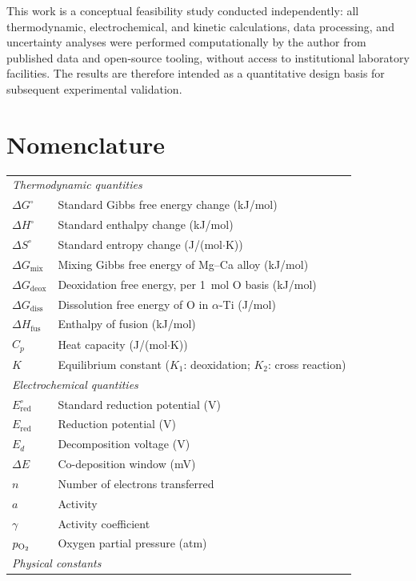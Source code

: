 \documentclass[pdflatex,sn-basic,Numbered]{sn-jnl}
\begin{document}
This work is a conceptual feasibility study conducted independently: all thermodynamic, electrochemical, and kinetic calculations, data processing, and uncertainty analyses were performed computationally by the author from published data and open-source tooling, without access to institutional laboratory facilities. The results are therefore intended as a quantitative design basis for subsequent experimental validation.


\section*{Nomenclature}

\small
\begin{tabular}{ll}
\multicolumn{2}{l}{\textit{Thermodynamic quantities}} \\
$\Delta G^{\circ}$ & Standard Gibbs free energy change (kJ/mol) \\
$\Delta H^{\circ}$ & Standard enthalpy change (kJ/mol) \\
$\Delta S^{\circ}$ & Standard entropy change (J/(mol$\cdot$K)) \\
$\Delta G_{\mathrm{mix}}$ & Mixing Gibbs free energy of Mg--Ca alloy (kJ/mol) \\
$\Delta G_{\mathrm{deox}}$ & Deoxidation free energy, per 1~mol O basis (kJ/mol) \\
$\Delta G_{\mathrm{diss}}$ & Dissolution free energy of O in $\alpha$-Ti (J/mol) \\
$\Delta H_{\mathrm{fus}}$ & Enthalpy of fusion (kJ/mol) \\
$C_p$ & Heat capacity (J/(mol$\cdot$K)) \\
$K$ & Equilibrium constant ($K_1$: deoxidation; $K_2$: cross reaction) \\
\multicolumn{2}{l}{\textit{Electrochemical quantities}} \\
$E^{\circ}_{\mathrm{red}}$ & Standard reduction potential (V) \\
$E_{\mathrm{red}}$ & Reduction potential (V) \\
$E_d$ & Decomposition voltage (V) \\
$\Delta E$ & Co-deposition window (mV) \\
$n$ & Number of electrons transferred \\
$a$ & Activity \\
$\gamma$ & Activity coefficient \\
$p_{\ce{O2}}$ & Oxygen partial pressure (atm) \\
\multicolumn{2}{l}{\textit{Physical constants}} \\

\end{tabular}
\end{document}
